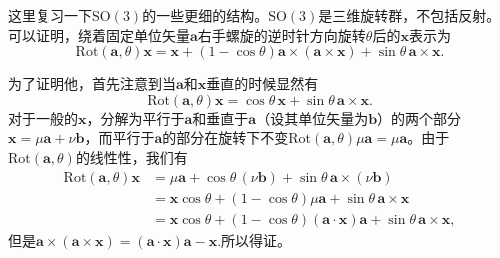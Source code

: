 \documentclass[9pt]{extbook}
\begin{document}
这里复习一下$\mathrm{SO}(3)$的一些更细的结构。$\mathrm{SO}(3)$是三维旋转群，不包括反射。可以证明，绕着固定单位矢量$\bm{a}$右手螺旋的逆时针方向旋转$\theta$后的$\bm{x}$表示为
\[
\mathrm{Rot}(\bm{a},\theta)\bm{x}=\bm{x}+(1-\cos\theta)\bm{a}\times(\bm{a}\times\bm{x})+
\sin\theta\,\bm{a}\times\bm{x}.
\]

为了证明他，首先注意到当$\bm{a}$和$\bm{x}$垂直的时候显然有
\[
\mathrm{Rot}(\bm{a},\theta)\bm{x}=\cos\theta\,\bm{x}+
\sin\theta\,\bm{a}\times\bm{x}.
\]
对于一般的$\bm{x}$，分解为平行于$\bm{a}$和垂直于$\bm{a}$（设其单位矢量为$\bm{b}$）的两个部分$\bm{x}=\mu\bm{a}+\nu\bm{b}$，而平行于$\bm{a}$的部分在旋转下不变$\mathrm{Rot}(\bm{a},\theta)\mu\bm{a}=\mu\bm{a}$。由于$\mathrm{Rot}(\bm{a},\theta)$的线性性，我们有
\[
\begin{split}
\mathrm{Rot}(\bm{a},\theta)\bm{x}&=\mu\bm{a}+\cos\theta\,(\nu\bm{b})+
\sin\theta\,\bm{a}\times(\nu\bm{b})\\
&=\bm{x}\cos\theta+(1-\cos\theta)\mu\bm{a}+
\sin\theta\,\bm{a}\times\bm{x}\\
&=\bm{x}\cos\theta+(1-\cos\theta)(\bm{a}\cdot\bm{x})\bm{a}+
\sin\theta\,\bm{a}\times \bm{x},
\end{split}
\]
但是$\bm{a}\times(\bm{a}\times\bm{x})=(\bm{a}\cdot\bm{x})\bm{a}-\bm{x}$.所以得证。
\end{document}
